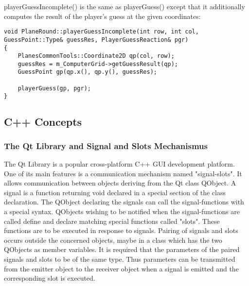 playerGuessIncomplete() is the same as playerGuess() except that it additionally  computes the result of the player's guess at the given coordinates:

\begin {lstlisting}
void PlaneRound::playerGuessIncomplete(int row, int col, GuessPoint::Type& guessRes, PlayerGuessReaction& pgr)
{
	PlanesCommonTools::Coordinate2D qp(col, row);
	guessRes = m_ComputerGrid->getGuessResult(qp);
	GuessPoint gp(qp.x(), qp.y(), guessRes);
	
	playerGuess(gp, pgr);
}
\end{lstlisting}

\subsection{C++ Concepts}

\subsubsection{The Qt Library and Signal and Slots Mechanismus} \label {Qt_Signals_Slots}

The Qt Library is a popular cross-platform C++ GUI development platform. One of its main features is a communication mechanism named "signal-slots". It allows communication between objects deriving from the Qt class QObject. A signal is a function returning void declared in a special section of the class declaration. The QObject declaring the signals can call the signal-functions with a special syntax. QObjects wishing to be notified when the signal-functions are called define and declare matching special functions called "slots". These functions are to be executed in response to signals. Pairing of signals and slots occurs outside the concerned objects, maybe in a class which has the two QObjects as member variables. It is required that the parameters of the paired signals and slots to be of the same type. Thus parameters can be transmitted from the emitter object to the receiver object when a signal is emitted and the corresponding slot is executed. 


